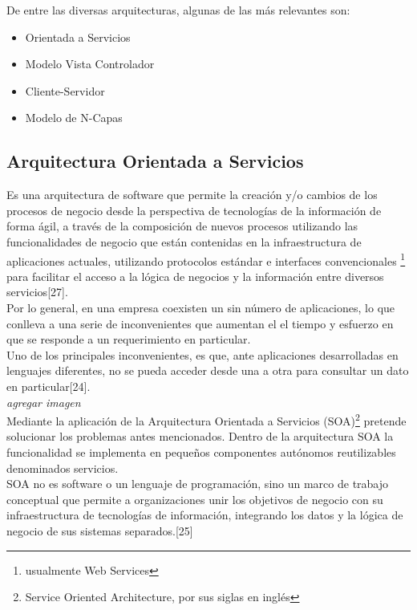 De entre las diversas arquitecturas, algunas de las más relevantes son:
\begin{itemize}
 \item Orientada a Servicios
 \item Modelo Vista Controlador
 \item Cliente-Servidor
 \item Modelo de N-Capas
\end{itemize}

\subsection{Arquitectura Orientada a Servicios}

Es una arquitectura de software que permite la creación y/o cambios de los procesos de negocio desde la perspectiva 
de tecnologías de la información de forma ágil, a través de la composición de nuevos procesos utilizando las funcionalidades 
de negocio que están contenidas en la infraestructura de aplicaciones actuales, utilizando protocolos estándar e interfaces 
convencionales \footnote{usualmente Web Services} para facilitar el acceso a la lógica de negocios y la información entre diversos 
servicios[27].\\

Por lo general, en una empresa coexisten un sin número de aplicaciones, lo que conlleva a una serie de inconvenientes que aumentan el 
el tiempo y esfuerzo en que se responde a un requerimiento en particular.\\

Uno de los principales inconvenientes, es que, ante aplicaciones desarrolladas en lenguajes diferentes, no se pueda acceder desde una
a otra para consultar un dato en particular[24].\\

\textit{agregar imagen}\\

Mediante la aplicación de la Arquitectura Orientada a Servicios (SOA)\footnote{Service Oriented Architecture, por sus siglas en inglés} 
pretende solucionar los problemas antes mencionados. Dentro de la arquitectura SOA la funcionalidad se implementa en pequeños componentes 
autónomos reutilizables denominados servicios.\\

SOA no es software o un lenguaje de programación, sino un marco de trabajo conceptual que permite a organizaciones unir los
objetivos de negocio con su infraestructura de tecnologías de información, integrando los datos y la lógica de negocio de sus 
sistemas separados.[25]\\

